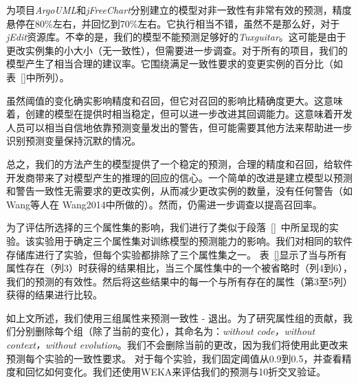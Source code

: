 {为项目{\em ArgoUML}和{\em jFreeChart}分别建立的模型对非一致性有非常有效的预测，精度悬停在80\%左右，并回忆到70\%左右。它执行相当不错，虽然不是那么好，对于{\em jEdit}资源库。不幸的是，我们的模型不能预测足够好的{\em Tuxguitar}。这可能是由于更改实例集的小大小（无一致性），但需要进一步调查。对于所有的项目，我们的模型产生了相当合理的建议率。它围绕满足一致性要求的变更实例的百分比（如表~\ref {}中所列）。

虽然阈值的变化确实影响精度和召回，但它对召回的影响比精确度更大。这意味着，创建的模型在提供时相当稳定，但可以进一步改进其回调能力。这意味着开发人员可以相当自信地依靠预测变量发出的警告，但可能需要其他方法来帮助进一步识别预测变量保持沉默的情况。

总之，我们的方法产生的模型提供了一个稳定的预测，合理的精度和召回，给软件开发商带来了对模型产生的推理的回应的信心。一个简单的改进是建立模型以预测和警告一致性无需要求的更改实例，从而减少更改实例的数量，没有任何警告（如Wang等人在\cite{} {Wang2014}中所做的）。然而，仍需进一步调查以提高召回率。

为了评估所选择的三个属性集的影响，我们进行了类似于段落~\ref {}~中所呈现的实验。该实验用于确定三个属性集对训练模型的预测能力的影响。我们对相同的软件存储库进行了实验，但每个实验都排除了三个属性集之一。
表~\ref{}显示了当与所有属性存在（{列3}）时获得的结果相比，当三个属性集中的一个被省略时（{列4到6}），我们的预测的有效性。然后将这些结果中的每一个与所有存在的属性（第3至5列）获得的结果进行比较。

如上文所述，我们使用{三组属性}来预测一致性 - 退出。为了研究属性组的贡献，我们分别删除每个组（除了当前的变化），其命名为：{\em without code，without context，without evolution}。我们不会删除当前的更改，因为我们将使用此更改来预测每个实验的一致性要求。 对于每个实验，我们固定阈值从0.9到0.5，并查看精度和回忆如何变化。我们还使用WEKA来评估我们的预测与10折交叉验证。

}

